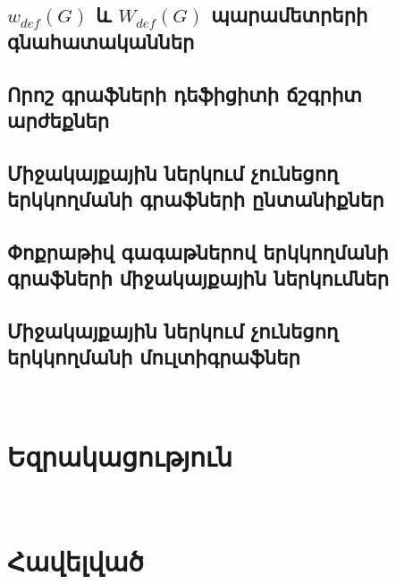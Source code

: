 \documentclass[a4paper,12pt,final]{article}
\let\stdsection\section
\renewcommand\section{\newpage\stdsection}
\begin{document}
\subsection{\texorpdfstring{$w_{def}(G)$}{w\_def(G)} և \texorpdfstring{$W_{def}(G)$}{W\_def(G)} պարամետրերի գնահատականներ} \label{s_wdef}


\subsection{Որոշ գրաֆների դեֆիցիտի ճշգրիտ արժեքներ}


\subsection{Միջակայքային ներկում չունեցող երկկողմանի գրաֆների ընտանիքներ}


\subsection {Փոքրաթիվ գագաթներով երկկողմանի գրաֆների միջակայքային ներկումներ}


\subsection{Միջակայքային ներկում չունեցող երկկողմանի մուլտիգրաֆներ}\



\section*{Եզրակացություն}\


\begin{thebibliography}{99}

\end{thebibliography}

\section*{Հավելված}\

\end{document}
